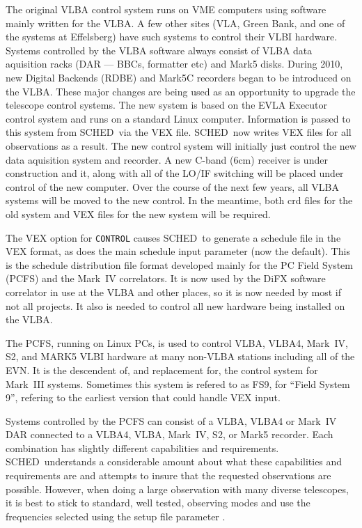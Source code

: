 \documentclass{report}
\newcommand{\schedb}{{\sc SCHED~}}
\begin{document}
The original VLBA control system runs on VME computers using software
mainly written for the VLBA.  A few other sites (VLA, Green Bank, and
one of the systems at Effelsberg) have such systems to control their
VLBI hardware.  Systems controlled by the VLBA software always consist
of VLBA data aquisition racks (DAR --- BBCs, formatter etc) and Mark5
disks.  During 2010, new Digital Backends (RDBE) and Mark5C recorders
began to be introduced on the VLBA.  These major changes are being
used as an opportunity to upgrade the telescope control systems.  The
new system is based on the EVLA Executor control system and runs on a
standard Linux computer.  Information is passed to this system from
\schedb via the VEX file.  \schedb now writes VEX files for all
observations as a result.  The new control system will initially just
control the new data aquisition system and recorder.  A new C-band
(6cm) receiver is under construction and it, along with all of the
LO/IF switching will be placed under control of the new computer.
Over the course of the next few years, all VLBA systems will be moved
to the new control.  In the meantime, both crd files for the old
system and VEX files for the new system will be required.

The VEX option for {\tt CONTROL} causes \schedb to generate a schedule
file in the VEX format, as does the 
main schedule input parameter (now the default).  This is the schedule
distribution file format developed mainly for the PC Field System
(PCFS) and the Mark~IV correlators.  It is now used by the DiFX
software correlator in use at the VLBA and other places, so it is
now needed by most if not all projects.  It also is needed to control
all new hardware being installed on the VLBA.

The PCFS, running on Linux PCs, is used to control VLBA,
VLBA4, Mark~IV, S2, and MARK5 VLBI hardware at many non-VLBA stations
including all of the EVN.  It is the descendent of, and replacement
for, the control system for Mark~III systems.  Sometimes this system
is refered to as FS9, for ``Field System 9'', refering to the earliest
version that could handle VEX input.

Systems controlled by the PCFS can consist of a VLBA, VLBA4 or Mark~IV
DAR connected to a VLBA4, VLBA, Mark~IV, S2, or Mark5 recorder.  Each
combination has slightly different capabilities and requirements.
\schedb understands a considerable amount about what these
capabilities and requirements are and attempts to insure that the
requested observations are possible.  However, when doing a large
observation with many diverse telescopes, it is best to stick to
standard, well tested, observing modes and use the frequencies
selected using the setup file parameter .
\end{document}
